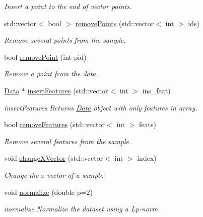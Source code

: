 \begin{DoxyCompactItemize}
\begin{DoxyCompactList}\small\item\em Insert a point to the end of vector points. \end{DoxyCompactList}\item 
std\+::vector$<$ bool $>$ \hyperlink{class_data_a6cc376e614e5440061c66833e1c8d30a}{remove\+Points} (std\+::vector$<$ int $>$ ids)
\begin{DoxyCompactList}\small\item\em Remove several points from the sample. \end{DoxyCompactList}\item 
bool \hyperlink{class_data_ad927494a13a5018ff3644212d7234a03}{remove\+Point} (int pid)
\begin{DoxyCompactList}\small\item\em Remove a point from the data. \end{DoxyCompactList}\item 
\hyperlink{class_data}{Data} $\ast$ \hyperlink{class_data_a5eb92a397e4eafb02f3c012658c78b37}{insert\+Features} (std\+::vector$<$ int $>$ ins\+\_\+feat)
\begin{DoxyCompactList}\small\item\em insert\+Features Returns \hyperlink{class_data}{Data} object with only features in array. \end{DoxyCompactList}\item 
bool \hyperlink{class_data_a0e0136f31687452ff10b489f8804ceb8}{remove\+Features} (std\+::vector$<$ int $>$ feats)
\begin{DoxyCompactList}\small\item\em Remove several features from the sample. \end{DoxyCompactList}\item 
void \hyperlink{class_data_a3e66e3dce7675bf2a1eded906e3d7912}{change\+X\+Vector} (std\+::vector$<$ int $>$ index)
\begin{DoxyCompactList}\small\item\em Change the x vector of a sample. \end{DoxyCompactList}\item 
void \hyperlink{class_data_a38bbab57bd9d871bd78771df47529d6b}{normalize} (double p=2)
\begin{DoxyCompactList}\small\item\em normalize Normalize the dataset using a Lp-\/norm. \end{DoxyCompactList}\item 
\mbox{\label{class_data_a92a70787d983df3d92b3b93a947aea8c}} 

\end{DoxyCompactItemize}
